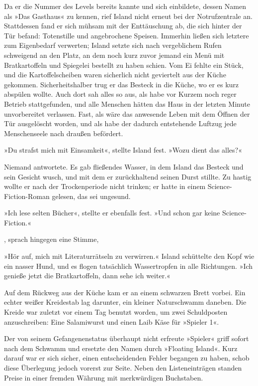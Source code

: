 Da er die Nummer des Levels bereits kannte und sich einbildete, dessen Namen als »Das Gasthaus« zu kennen, rief Island nicht erneut bei der Notrufzentrale an. Stattdessen fand er sich mühsam mit der Enttäuschung ab, die sich hinter der Tür befand: Totenstille und angebrochene Speisen. Immerhin ließen sich letztere zum Eigenbedarf verwerten; Island setzte sich nach vergeblichem Rufen schweigend an den Platz, an dem noch kurz zuvor jemand ein Menü mit Bratkartoffeln und Spiegelei bestellt zu haben schien. Vom Ei fehlte ein Stück, und die Kartoffelscheiben waren sicherlich nicht geviertelt aus der Küche gekommen. Sicherheitshalber trug er das Besteck in die Küche, wo er es kurz abspülen wollte. Auch dort sah alles so aus, als habe vor Kurzem noch reger Betrieb stattgefunden, und alle Menschen hätten das Haus in der letzten Minute unvorbereitet verlassen. Fast, als wäre das anwesende Leben mit dem Öffnen der Tür ausgelöscht worden, und als habe der dadurch entstehende Luftzug jede Menschenseele nach draußen befördert.

»Du strafst mich mit Einsamkeit«, stellte Island fest. »Wozu dient das alles?«

Niemand antwortete. Es gab fließendes Wasser, in dem Island das Besteck und sein Gesicht wusch, und mit dem er zurückhaltend seinen Durst stillte. Zu hastig wollte er nach der Trockenperiode nicht trinken; er hatte in einem Science-Fiction-Roman gelesen, das sei ungesund.

»Ich lese selten Bücher«, stellte er ebenfalls fest. »Und schon gar keine Science-Fiction.«

, sprach hingegen eine Stimme, 

»Hör auf, mich mit Literaturrätseln zu verwirren.« Island schüttelte den Kopf wie ein nasser Hund, und es flogen tatsächlich Wassertropfen in alle Richtungen. »Ich genieße jetzt die Bratkartoffeln, dann sehe ich weiter.«

Auf dem Rückweg aus der Küche kam er an einem schwarzen Brett vorbei. Ein echter weißer Kreidestab lag darunter, ein kleiner Naturschwamm daneben. Die Kreide war zuletzt vor einem Tag benutzt worden, um zwei Schuldposten anzuschreiben: Eine Salamiwurst und einen Laib Käse für »Spieler 1«.

Der von seinem Gefangenenstatus überhaupt nicht erfreute »Spieler« griff sofort nach dem Schwamm und ersetzte den Namen durch »Floating Island«. Kurz darauf war er sich sicher, einen entscheidenden Fehler begangen zu haben, schob diese Überlegung jedoch vorerst zur Seite. Neben den Listeneinträgen standen Preise in einer fremden Währung mit merkwürdigen Buchstaben.

